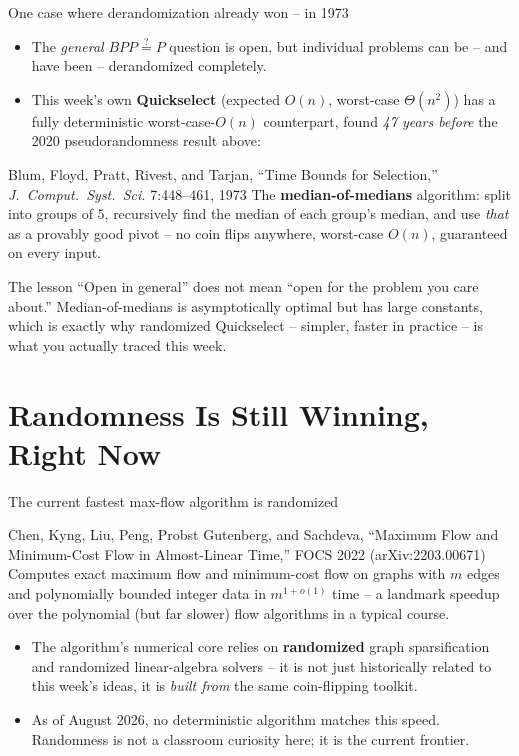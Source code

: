 \documentclass[11pt,aspectratio=169]{beamer}
\begin{document}
\begin{frame}{One case where derandomization already won -- in 1973}
  \small
  \begin{itemize}
    \item The \emph{general} $BPP \stackrel{?}{=} P$ question is open, but individual
    problems can be -- and have been -- derandomized completely.
    \item This week's own \textbf{Quickselect} (expected $O(n)$, worst-case
    $\Theta(n^2)$) has a fully deterministic worst-case-$O(n)$ counterpart, found
    \emph{47 years before} the 2020 pseudorandomness result above:
  \end{itemize}
  \begin{block}{Blum, Floyd, Pratt, Rivest, and Tarjan, ``Time Bounds for Selection,''
  \emph{J.\ Comput.\ Syst.\ Sci.} 7:448--461, 1973}
    The \textbf{median-of-medians} algorithm: split into groups of $5$, recursively find
    the median of each group's median, and use \emph{that} as a provably good pivot --
    no coin flips anywhere, worst-case $O(n)$, guaranteed on every input.
  \end{block}
  \begin{exampleblock}{The lesson}
    ``Open in general'' does not mean ``open for the problem you care about.'' Median-of-medians
    is asymptotically optimal but has large constants, which is exactly why randomized
    Quickselect -- simpler, faster in practice -- is what you actually traced this week.
  \end{exampleblock}
\end{frame}

\section{Randomness Is Still Winning, Right Now}

\begin{frame}{The current fastest max-flow algorithm is randomized}
  \begin{block}{Chen, Kyng, Liu, Peng, Probst Gutenberg, and Sachdeva, ``Maximum Flow
  and Minimum-Cost Flow in Almost-Linear Time,'' FOCS 2022 (arXiv:2203.00671)}
    Computes exact maximum flow and minimum-cost flow on graphs with $m$ edges and
    polynomially bounded integer data in $m^{1+o(1)}$ time -- a landmark speedup over
    the polynomial (but far slower) flow algorithms in a typical course.
  \end{block}
  \begin{itemize}
    \item The algorithm's numerical core relies on \textbf{randomized} graph
    sparsification and randomized linear-algebra solvers -- it is not just historically
    related to this week's ideas, it is \emph{built from} the same coin-flipping toolkit.
    \item As of August 2026, no deterministic algorithm matches this speed. Randomness
    is not a classroom curiosity here; it is the current frontier.
  \end{itemize}
\end{frame}
\end{document}
